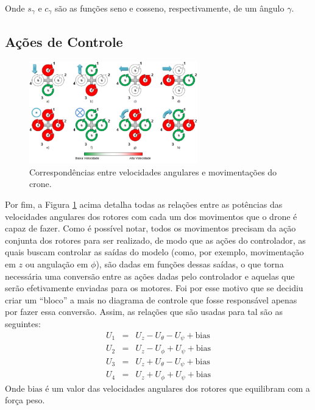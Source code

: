 \vspace{+0.5cm}

Onde $s_{\gamma}$ e $c_{\gamma}$ são as funções seno e cosseno, respectivamente, de um ângulo $\gamma$.

\subsection{Ações de Controle}

\begin{figure}[h!]
    \centering
    \includegraphics[width=0.65\textwidth]{figs/mov_drone.png}
    \caption{Correspondências entre velocidades angulares e movimentações do crone. \cite{usp}}
    \label{fig:movimento}
\end{figure}

\pagebreak

Por fim, a Figura \ref{fig:movimento} acima detalha todas as relações entre as potências das velocidades angulares 
dos rotores com cada um dos movimentos que o drone é capaz de fazer.
Como é possível notar, todos os movimentos precisam da ação conjunta dos rotores para ser realizado, de modo que 
as ações do controlador, as quais buscam controlar as saídas do modelo (como, por exemplo, movimentação em $z$ ou 
angulação em $\phi$), são dadas em funções dessas saídas, o que torna necessária uma conversão entre as ações dadas 
pelo controlador e aquelas que serão efetivamente enviadas para os motores. Foi por esse motivo que se decidiu criar 
um ``bloco'' a mais no diagrama de controle que fosse responsável apenas por fazer essa conversão. Assim, as relações 
que são usadas para tal são as seguintes:
\begin{eqnarray}
    U_1 &=& U_z - U_\theta - U_\psi + \text{bias} \\
    U_2 &=& U_z - U_\phi + U_\psi + \text{bias} \\
    U_3 &=& U_z + U_\theta - U_\psi + \text{bias} \\
    U_4 &=& U_z + U_\phi + U_\psi + \text{bias}
\end{eqnarray}
Onde $\text{bias}$ é um valor das velocidades angulares dos rotores que equilibram com a força peso.